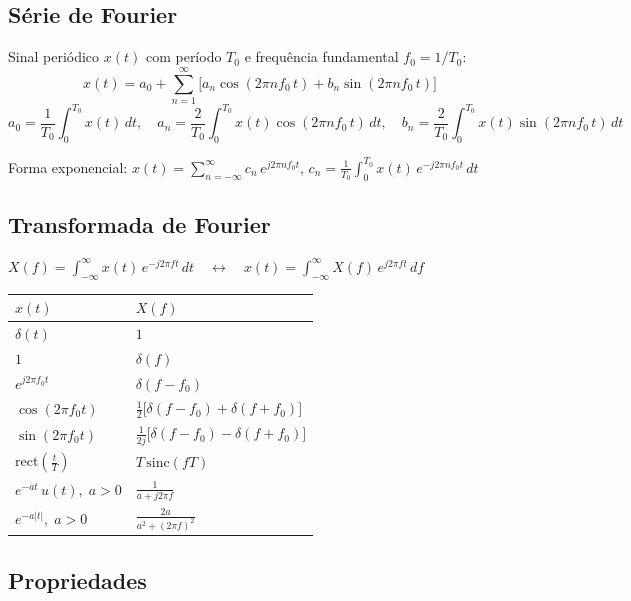 \documentclass[11pt,a4paper]{article}
\begin{document}
\subsection*{Série de Fourier}

Sinal periódico $x(t)$ com período $T_0$ e frequência fundamental $f_0 = 1/T_0$:
\[
  x(t) = a_0 + \sum_{n=1}^{\infty}\Big[a_n\cos(2\pi n f_0\,t) + b_n\sin(2\pi n f_0\,t)\Big]
\]
\[
  a_0 = \frac{1}{T_0}\int_{0}^{T_0} x(t)\,dt, \quad
  a_n = \frac{2}{T_0}\int_{0}^{T_0} x(t)\cos(2\pi n f_0\,t)\,dt, \quad
  b_n = \frac{2}{T_0}\int_{0}^{T_0} x(t)\sin(2\pi n f_0\,t)\,dt
\]

Forma exponencial: $\displaystyle x(t) = \sum_{n=-\infty}^{\infty} c_n\, e^{j2\pi n f_0 t}$, \quad $\displaystyle c_n = \frac{1}{T_0}\int_{0}^{T_0} x(t)\,e^{-j2\pi n f_0 t}\,dt$

\subsection*{Transformada de Fourier}

$\displaystyle X(f) = \int_{-\infty}^{\infty} x(t)\,e^{-j2\pi f t}\,dt \quad\longleftrightarrow\quad x(t) = \int_{-\infty}^{\infty} X(f)\,e^{j2\pi f t}\,df$

\renewcommand{\arraystretch}{1.5}
\begin{center}
\begin{tabular}{>{\centering\arraybackslash}m{5.5cm} >{\centering\arraybackslash}m{5.5cm}}
  \toprule
  $x(t)$ & $X(f)$ \\
  \midrule
  $\delta(t)$ & $1$ \\
  $1$ & $\delta(f)$ \\
  $e^{j2\pi f_0 t}$ & $\delta(f - f_0)$ \\
  $\cos(2\pi f_0 t)$ & $\frac{1}{2}\big[\delta(f - f_0) + \delta(f + f_0)\big]$ \\
  $\sin(2\pi f_0 t)$ & $\frac{1}{2j}\big[\delta(f - f_0) - \delta(f + f_0)\big]$ \\
  $\mathrm{rect}\!\left(\frac{t}{T}\right)$ & $T\,\mathrm{sinc}(fT)$ \\
  $e^{-at}\,u(t),\; a > 0$ & $\frac{1}{a + j2\pi f}$ \\
  $e^{-a|t|},\; a > 0$ & $\frac{2a}{a^2 + (2\pi f)^2}$ \\
  \bottomrule
\end{tabular}
\end{center}

\subsection*{Propriedades}
\end{document}
